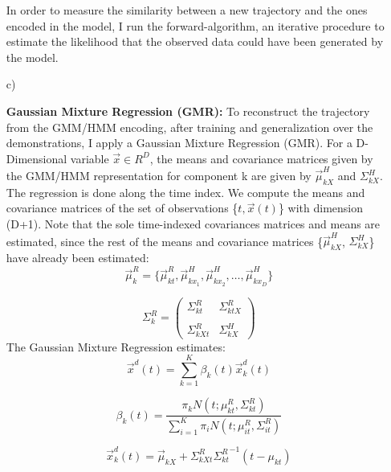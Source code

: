 \documentclass[conference]{IEEEtran}
\begin{document}
\begin{itemize}
{    In order to measure the similarity between a new trajectory and the ones encoded in the model, I run the forward-algorithm, an iterative procedure to estimate the likelihood that the observed data could have been generated by the model.
}
\\
\item[c)]{
    \textbf{Gaussian Mixture Regression (GMR):} To reconstruct the trajectory from the GMM/HMM encoding, after training and generalization over the demonstrations, I apply a Gaussian Mixture Regression (GMR). For a D-Dimensional variable $\vec{x} \in R^{D}$, the means and covariance matrices given by the GMM/HMM representation for component k are given by $\vec{\mu}_{kX}^{H}$ and ${\Sigma}_{kX}^{H}$. The regression is done along the time index. We compute the means and covariance matrices of the set of observations \{$t, \vec{x}(t)$\} with dimension (D+1). Note that the sole time-indexed covariances matrices and means are estimated, since the rest of the means and covariance matrices \{$\vec{\mu}_{kX}^{H}$, ${\Sigma}_{kX}^{H}$\} have already been estimated:
    \begin{equation}
        \vec{\mu}_{k}^{R} = \{\vec{\mu}_{kt}^{R}, \vec{\mu}_{kx_{1}}^{H}, \vec{\mu}_{kx_{2}}^{H}, \dots, \vec{\mu}_{kx_{D}}^{H}\}
    \end{equation}

    \begin{equation}
        {\Sigma}_{k}^{R} = \begin{pmatrix} {\Sigma}_{kt}^{R}&{\Sigma}_{ktX}^{R}\\ \\ {\Sigma}_{kXt}^{R}&{\Sigma}_{kX}^{H} \end{pmatrix}
    \end{equation}
    The Gaussian Mixture Regression estimates:
    \begin{equation}
        \vec{x}^{d}(t) = \sum_{k=1}^{K} \beta_{k}(t)\vec{x}_{k}^{d}(t)
    \end{equation}

    \begin{equation}
        \beta_{k}(t) = \frac{\pi_{k}N(t;\mu_{kt}^{R},\Sigma_{kt}^{R})}{\sum_{i=1}^{K}\pi_{i}N(t;\mu_{it}^{R},\Sigma_{it}^{R})}
    \end{equation}

    \begin{equation}
        \vec{x}_{k}^{d}(t) = \vec{\mu}_{kX} + {\Sigma}_{kXt}^{R} {{\Sigma}_{kt}^{R}}^{-1} (t - \mu_{kt})
    \end{equation}

}
\end{itemize}
\end{document}
